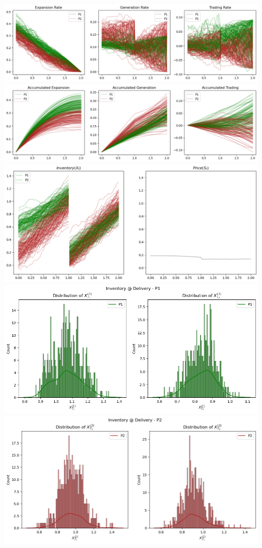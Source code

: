 \documentclass[
]{article}
\begin{document}
\includegraphics{Illustration_Diagrams/joint-2A2P-Sigmoid-ResExamples/Rates.png}
\includegraphics{Illustration_Diagrams/joint-2A2P-Sigmoid-ResExamples/AccumRates.png}
\includegraphics{Illustration_Diagrams/joint-2A2P-Sigmoid-ResExamples/InvAndPrice.png}
\includegraphics{Illustration_Diagrams/joint-2A2P-Sigmoid-ResExamples/InvPreDeli_P1.png}
\includegraphics{Illustration_Diagrams/joint-2A2P-Sigmoid-ResExamples/InvPreDeli_P2.png}
\end{document}
